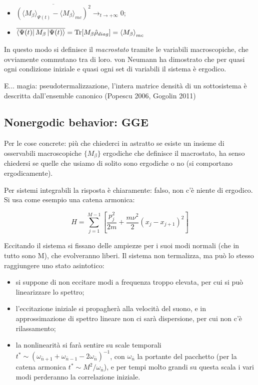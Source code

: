 \documentclass[a4paper,10pt,twocolumn]{article}
\begin{document}
\begin{itemize}
	\item $ \overline{(\langle M_\beta \rangle_{\Psi(t)} - \langle M_\beta \rangle_{mc})^2} \rightarrow_{t \rightarrow + \infty} 0$;
	\item $ \overline{\bra{\Psi(t)} M_\beta \ket{\Psi(t)}} = \Tr[M_\beta \hat{\rho}_{diag}] = \expval{M_\beta}_{mc}$
\end{itemize}

\noindent In questo modo si definisce il \emph{macrostato} tramite le variabili macroscopiche, che ovviamente commutano tra di loro.
von Neumann ha dimostrato che per quasi ogni condizione iniziale e quasi ogni set di variabili il sistema è ergodico.

E... magia: pseudotermalizzazione, l'intera matrice densità di un sottosistema è descritta dall'ensemble canonico (Popescu 2006, Gogolin 2011)

\subsection{Nonergodic behavior: GGE}
Per le cose concrete: più che chiederci in astratto se esiste un insieme di osservabili macroscopiche $\{ M_\beta \}$ ergodiche che definisce il macrostato, ha senso chiedersi se quelle che usiamo di solito sono ergodiche o no (si comportano ergodicamente).

Per sistemi integrabili la risposta è chiaramente: falso, non c'è niente di ergodico. Si usa come esempio una catena armonica:

\begin{equation}
H = \sum_{j=1}^{M-1} \left[\frac{p_j^2}{2m} + \frac{m \nu^2}{2} (x_j - x_{j+1})^2\right]
\end{equation}

Eccitando il sistema si fissano delle ampiezze per i suoi modi normali (che in tutto sono M), che evolveranno liberi. 
Il sistema non termalizza, ma può lo stesso raggiungere uno stato asintotico:
\begin{itemize}
	\item si suppone di non eccitare modi a frequenza troppo elevata, per cui si può linearizzare lo spettro;
	\item l'eccitazione iniziale si propagherà alla velocità del suono, e in approssimazione di spettro lineare non ci sarà dispersione, per cui non c'è rilassamento;
	\item la nonlinearità si farà sentire su scale temporali $t^* \sim (\omega_{\bar{n} + 1} + \omega_{\bar{n} - 1} - 2\omega_{\bar{n}})^{-1}$, con $\omega_{\bar{n}}$ la portante del pacchetto (per la catena armonica $t^* \sim M^2 / \omega_{\bar{n}}$), e per tempi molto grandi su questa scala i vari modi perderanno la correlazione iniziale.
\end{itemize}
\end{document}
